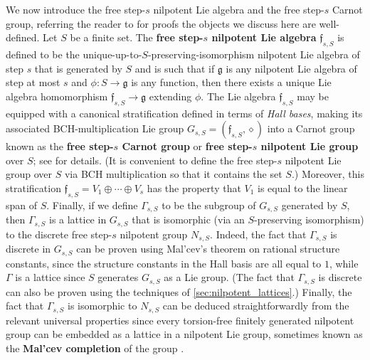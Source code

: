 We now introduce the free step-$s$ nilpotent Lie algebra and the free step-$s$ Carnot group, referring the reader to \cite[Chapter 14.1]{bonfiglioli2007stratified} for proofs the objects we discuss here are well-defined.
Let $S$ be a finite set. The \textbf{free step-$s$ nilpotent Lie algebra} $\mathfrak{f}_{s,S}$ is defined to be the unique-up-to-$S$-preserving-isomorphism nilpotent Lie algebra of step $s$ that is generated by $S$ and is such that if $\mathfrak{g}$ is any nilpotent Lie algebra of step at most $s$ and $\phi:S\to \mathfrak{g}$ is any function, then there exists a unique Lie algebra homomorphism $\mathfrak{f}_{s,S}\to \mathfrak{g}$ extending $\phi$. The 
%
 Lie algebra $\mathfrak{f}_{s,S}$ may be
   equipped with a canonical stratification defined in terms of \emph{Hall bases}, making its associated BCH-multiplication Lie group $G_{s,S}=(\mathfrak{f}_{s,S},\diamond)$ into a Carnot group known as the \textbf{free step-$s$ Carnot group} or \textbf{free step-$s$ nilpotent Lie group} over $S$; see \cite[Chapters 14.1 and 14.2]{bonfiglioli2007stratified} for details. (It is convenient to define the free step-$s$ nilpotent Lie group over $S$ via BCH multiplication so that it contains the set $S$.) Moreover, this stratification $\mathfrak{f}_{s,S}=V_1 \oplus \cdots \oplus V_s$ has the property that $V_1$ is equal to the linear span of $S$. Finally, if we define $\Gamma_{s,S}$ to be the subgroup of $G_{s,S}$ generated by $S$, then $\Gamma_{s,S}$ is a lattice in $G_{s,S}$ that is isomorphic (via an $S$-preserving isomorphism) to the discrete free step-$s$ nilpotent group $N_{s,S}$. Indeed, the fact that $\Gamma_{s,S}$ is discrete in $G_{s,S}$ can be proven using Mal'cev's theorem on rational structure constants, since the structure constants in the Hall basis are all equal to $1$, while $\Gamma$ is a lattice since $S$ generates $G_{s,S}$ as a Lie group. (The fact that $\Gamma_{s,S}$ is discrete can also be proven using the techniques of \cref{sec:nilpotent_lattices}.) Finally, the fact that $\Gamma_{s,S}$ is isomorphic to $N_{s,S}$ can be deduced straightforwardly from the relevant universal properties since every torsion-free finitely generated nilpotent group can be embedded as a lattice in a nilpotent Lie group, sometimes known as the \textbf{Mal'cev completion} of the group \cite[Theorem 2.18]{raghunathan1972discrete}.

\medskip

